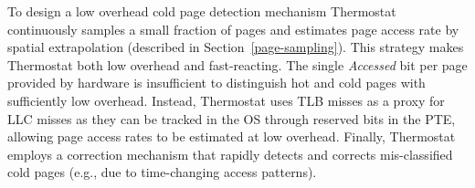 To design a low overhead cold page detection mechanism Thermostat continuously samples a
small fraction of pages and estimates page access rate by spatial extrapolation
(described in Section~\ref{page-sampling}).
This strategy makes Thermostat both low overhead and fast-reacting. The single
\emph{Accessed} bit per page provided by hardware is insufficient to distinguish hot
and cold pages with sufficiently low overhead.  Instead, Thermostat uses TLB misses as a proxy for LLC misses 
as they can be tracked in the OS through reserved bits in the PTE, allowing page access rates to be estimated at low overhead.
Finally, Thermostat employs a correction mechanism that rapidly detects
and corrects mis-classified cold pages (e.g., due to time-changing access patterns).

